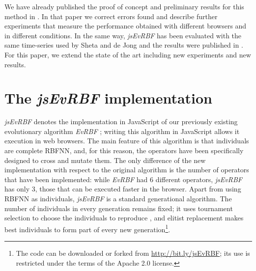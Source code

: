 \documentclass{article}
\begin{document}
We have already published the proof of concept and preliminary results
for this method in \cite{DBLP:conf/dcai/RivasPMAG16}. In that paper we
correct errors found and describe further experiments that measure the
performance obtained with different browsers and in different
conditions. In the same way, {\em jsEvRBF} has been evaluated with the same time-series
used by Sheta and de Jong \cite{Sheta2001} and the results were
published in \cite{DBLP:conf/dcai/RivasPMAG16}. For this paper, we
extend the state of the art including new experiments and new
results. %


\section{The {\em jsEvRBF} implementation} %
\label{sec:algorithm}
{\em jsEvRBF} denotes the implementation in JavaScript of our previously existing evolutionary algorithm {\em EvRBF} \cite{rivas03:EvRBF} ; writing this algorithm in JavaScript allows it execution in web browsers.
The main feature of this algorithm is that individuals are complete RBFNN, and, for this reason,
the operators have been specifically designed to cross and mutate them. The only difference of the new implementation with respect to the original algorithm is the number of operators that have been implemented: while {\em EvRBF} had 6 different operators, {\em jsEvRBF} has only 3, those that can be executed faster in the browser.%
Apart from using RBFNN as individuals, {\em jsEvRBF} is a standard generational algorithm. The number of individuals in every generation remains fixed; it uses tournament selection to choose the individuals to reproduce , and elitist replacement  makes best individuals to form part of every new generation\footnote{The code can be downloaded or forked from
  \url{http://bit.ly/jsEvRBF}; its use is restricted under the terms
  of the Apache 2.0 license.}.
\end{document}
